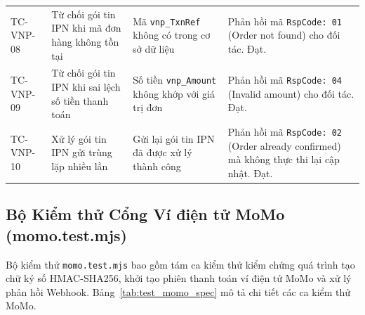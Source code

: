 \begin{table}[H]
\begin{tabularx}{\textwidth}{p{2cm}p{3.8cm}p{3cm}X}
\addlinespace
TC-VNP-08 & Từ chối gói tin IPN khi mã đơn hàng không tồn tại & Mã \texttt{vnp\_TxnRef} không có trong cơ sở dữ liệu & Phản hồi mã \texttt{RspCode: 01} (Order not found) cho đối tác. Đạt. \\
\addlinespace
TC-VNP-09 & Từ chối gói tin IPN khi sai lệch số tiền thanh toán & Số tiền \texttt{vnp\_Amount} không khớp với giá trị đơn & Phản hồi mã \texttt{RspCode: 04} (Invalid amount) cho đối tác. Đạt. \\
\addlinespace
TC-VNP-10 & Xử lý gói tin IPN gửi trùng lặp nhiều lần & Gửi lại gói tin IPN đã được xử lý thành công & Phản hồi mã \texttt{RspCode: 02} (Order already confirmed) mà không thực thi lại cập nhật. Đạt. \\
\bottomrule
\end{tabularx}
\end{table}

\subsection{Bộ Kiểm thử Cổng Ví điện tử MoMo (momo.test.mjs)}
Bộ kiểm thử \texttt{momo.test.mjs} bao gồm tám ca kiểm thử kiểm chứng quá trình tạo chữ ký số HMAC-SHA256, khởi tạo phiên thanh toán ví điện tử MoMo và xử lý phản hồi Webhook. Bảng~\ref{tab:test_momo_spec} mô tả chi tiết các ca kiểm thử MoMo.

